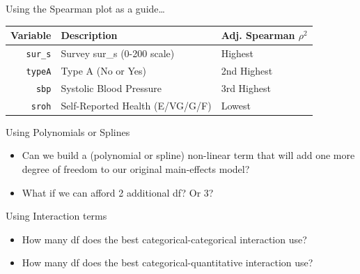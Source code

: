 \documentclass[
  ignorenonframetext,
]{beamer}
\providecommand{\tightlist}{%
  \setlength{\itemsep}{0pt}\setlength{\parskip}{0pt}}
\begin{document}
\begin{frame}[fragile]{Using the Spearman plot as a guide\ldots{}}
\protect\hypertarget{using-the-spearman-plot-as-a-guide}{}
\begin{longtable}[]{@{}rll@{}}
\toprule
Variable & Description & Adj. Spearman \(\rho^2\) \\
\midrule
\endhead
\texttt{sur\_s} & Survey sur\_s (0-200 scale) & Highest \\
\texttt{typeA} & Type A (No or Yes) & 2nd Highest \\
\texttt{sbp} & Systolic Blood Pressure & 3rd Highest \\
\texttt{sroh} & Self-Reported Health (E/VG/G/F) & Lowest \\
\bottomrule
\end{longtable}

\begin{block}{Using Polynomials or Splines}
\protect\hypertarget{using-polynomials-or-splines}{}
\begin{itemize}
\tightlist
\item
  Can we build a (polynomial or spline) non-linear term that will add
  one more degree of freedom to our original main-effects model?
\item
  What if we can afford 2 additional df? Or 3?
\end{itemize}
\end{block}

\begin{block}{Using Interaction terms}
\protect\hypertarget{using-interaction-terms}{}
\begin{itemize}
\tightlist
\item
  How many df does the best categorical-categorical interaction use?
\item
  How many df does the best categorical-quantitative interaction use?
\end{itemize}
\end{block}
\end{frame}
\end{document}
